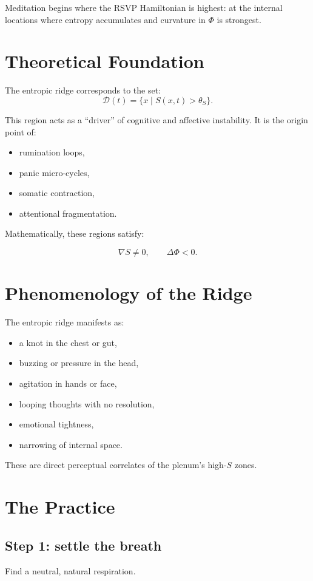 \documentclass[12pt]{article}
\begin{document}
Meditation begins where the RSVP Hamiltonian is highest:
at the internal locations where entropy accumulates and curvature in $\Phi$ is strongest.

\section{Theoretical Foundation}

The entropic ridge corresponds to the set:
\[
\mathcal{D}(t) = \{ x \mid S(x,t) > \theta_S \}.
\]

This region acts as a ``driver'' of cognitive and affective instability.
It is the origin point of:

\begin{itemize}
    \item rumination loops,
    \item panic micro-cycles,
    \item somatic contraction,
    \item attentional fragmentation.
\end{itemize}

Mathematically, these regions satisfy:

\[
\nabla S \neq 0, \qquad \Delta\Phi < 0.
\]

\section{Phenomenology of the Ridge}

The entropic ridge manifests as:

\begin{itemize}
    \item a knot in the chest or gut,
    \item buzzing or pressure in the head,
    \item agitation in hands or face,
    \item looping thoughts with no resolution,
    \item emotional tightness,
    \item narrowing of internal space.
\end{itemize}

These are direct perceptual correlates of the plenum’s high-$S$ zones.

\section{The Practice}

\subsection*{Step 1: settle the breath}
Find a neutral, natural respiration.
\end{document}
